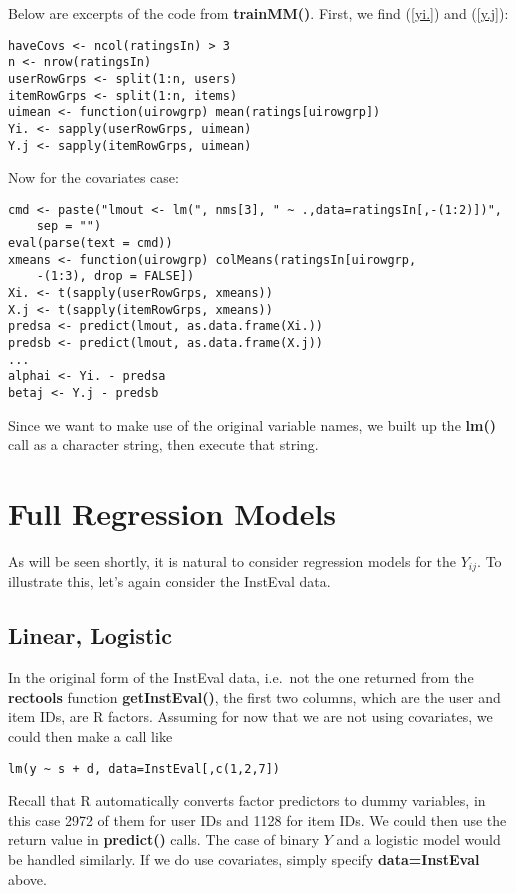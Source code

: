 Below are excerpts of the code from \textbf{trainMM()}.  First, we find
(\ref{yi.}) and (\ref{y.j}):

\begin{lstlisting}
haveCovs <- ncol(ratingsIn) > 3
n <- nrow(ratingsIn)
userRowGrps <- split(1:n, users)
itemRowGrps <- split(1:n, items)
uimean <- function(uirowgrp) mean(ratings[uirowgrp])
Yi. <- sapply(userRowGrps, uimean)
Y.j <- sapply(itemRowGrps, uimean)
\end{lstlisting}

Now for the covariates case:

\begin{lstlisting}
cmd <- paste("lmout <- lm(", nms[3], " ~ .,data=ratingsIn[,-(1:2)])",
    sep = "")
eval(parse(text = cmd))
xmeans <- function(uirowgrp) colMeans(ratingsIn[uirowgrp,
    -(1:3), drop = FALSE])
Xi. <- t(sapply(userRowGrps, xmeans))
X.j <- t(sapply(itemRowGrps, xmeans))
predsa <- predict(lmout, as.data.frame(Xi.))
predsb <- predict(lmout, as.data.frame(X.j))
...
alphai <- Yi. - predsa
betaj <- Y.j - predsb
\end{lstlisting}

Since we want to make use of the original variable names, we built up
the \textbf{lm()} call as a character string, then execute that string.

\section{Full Regression Models}

As will be seen shortly, it is natural to consider regression models for
the $Y_{ij}$.  To illustrate this, let's again consider the InstEval
data.

\subsection{Linear, Logistic}

In the original form of the InstEval data, i.e.\ not the one returned
from the \textbf{rectools} function \textbf{getInstEval()}, the first
two columns, which are the user and item IDs, are R factors.  Assuming
for now that we are not using covariates, we could
then make a call like

\begin{lstlisting}
lm(y ~ s + d, data=InstEval[,c(1,2,7]) 
\end{lstlisting}

Recall that R automatically converts factor predictors to dummy
variables, in this case 2972 of them for user IDs and 1128 for item IDs.
We could then use the return value in \textbf{predict()} calls.
The case of binary $Y$ and a logistic model would be handled similarly.
If we do use covariates, simply specify \textbf{data=InstEval} above.

